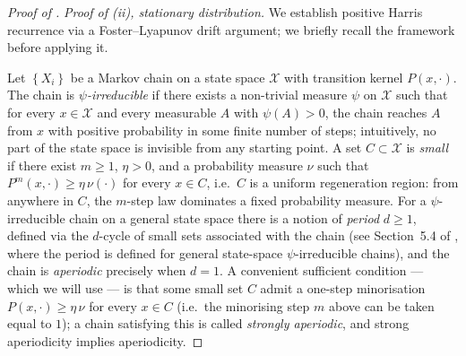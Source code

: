 \documentclass[10pt,a4paper]{amsart}
\newcommand{\Set}[1]{\left\{ #1 \right\}}
\newcommand{\mcX}{\mathcal{X}}
\begin{document}
\begin{proof}[Proof of ]
  \emph{Proof of (ii), stationary distribution.} We establish positive Harris recurrence via a Foster--Lyapunov drift argument; we briefly recall the framework before applying it.

  Let $\Set{X_i}$ be a Markov chain on a state space $\mcX$ with transition kernel $P(x, \cdot)$. The chain is \emph{$\psi$-irreducible} if there exists a non-trivial measure $\psi$ on $\mcX$ such that for every $x \in \mcX$ and every measurable $A$ with $\psi(A) > 0$, the chain reaches $A$ from $x$ with positive probability in some finite number of steps; intuitively, no part of the state space is invisible from any starting point. A set $C \subset \mcX$ is \emph{small} if there exist $m \ge 1$, $\eta > 0$, and a probability measure $\nu$ such that $P^m(x, \cdot) \ge \eta\,\nu(\cdot)$ for every $x \in C$, i.e.\ $C$ is a uniform regeneration region: from anywhere in $C$, the $m$-step law dominates a fixed probability measure. For a $\psi$-irreducible chain on a general state space there is a notion of \emph{period} $d \ge 1$, defined via the $d$-cycle of small sets associated with the chain (see Section~5.4 of \cite{meyn1993markov}, where the period is defined for general state-space $\psi$-irreducible chains), and the chain is \emph{aperiodic} precisely when $d = 1$. A convenient sufficient condition --- which we will use --- is that some small set $C$ admit a one-step minorisation $P(x, \cdot) \ge \eta\,\nu$ for every $x \in C$ (i.e.\ the minorising step $m$ above can be taken equal to $1$); a chain satisfying this is called \emph{strongly aperiodic}, and strong aperiodicity implies aperiodicity.


\end{proof}
\end{document}
